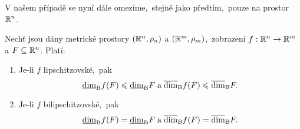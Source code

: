V našem případě se nyní dále omezíme,~stejně jako předtím,~pouze na prostor $\mathbb{R}^n$.

\begin{theorem}\label{thm:bc-dimenze-bi-lipschitzovska-zobrazeni}
    Nechť jsou dány metrické prostory $(\mathbb{R}^n,\rho_n)$ a $(\mathbb{R}^m,\rho_m)$,~zobrazení $f:\mathbb{R}^n \rightarrow \mathbb{R}^m$ a $F\subseteq\mathbb{R}^n$. Platí:
    \begin{enumerate}[label=(\roman*)]
        \item\label{thm:bc-dimenze-lipschitz} Je-li $f$ lipschitzovské,~pak
        \[\underline{\dim}_\textup{B}{f(F)}\leqslant\underline{\dim}_\textup{B}{F}\;\text{a}\;\overline{\dim}_\textup{B}{f(F)}\leqslant\overline{\dim}_\textup{B}{F}.\]
        \item\label{thm:bc-dimenze-bilipschitz} Je-li $f$ bilipschitzovské,~pak
        \[\underline{\dim}_\textup{B}{f(F)}=\underline{\dim}_\textup{B}{F}\;\text{a}\;\overline{\dim}_\textup{B}{f(F)}=\overline{\dim}_\textup{B}{F}.\]
    \end{enumerate}
\end{theorem}
